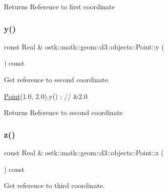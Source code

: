 \begin{DoxyReturn}{Returns}
Reference to first coordinate 
\end{DoxyReturn}
\mbox{\label{classostk_1_1math_1_1geom_1_1d3_1_1objects_1_1_point_a77c908e2091fa581f8e975824dbe4f22}} 
\subsubsection{\texorpdfstring{y()}{y()}}
{\footnotesize\ttfamily const Real \& ostk\+::math\+::geom\+::d3\+::objects\+::\+Point\+::y (\begin{DoxyParamCaption}{ }\end{DoxyParamCaption}) const}



Get reference to second coordinate. 


\begin{DoxyCode}
\hyperlink{classostk_1_1math_1_1geom_1_1d3_1_1objects_1_1_point_ad9bee5dadb878200f859b20a34680ae5}{Point}(1.0, 2.0).y() ; \textcolor{comment}{// &2.0}
\end{DoxyCode}


\begin{DoxyReturn}{Returns}
Reference to second coordinate 
\end{DoxyReturn}
\mbox{\label{classostk_1_1math_1_1geom_1_1d3_1_1objects_1_1_point_a16b88664b655d69c146421dfb75bc246}} 
\subsubsection{\texorpdfstring{z()}{z()}}
{\footnotesize\ttfamily const Real \& ostk\+::math\+::geom\+::d3\+::objects\+::\+Point\+::z (\begin{DoxyParamCaption}{ }\end{DoxyParamCaption}) const}



Get reference to third coordinate. 


